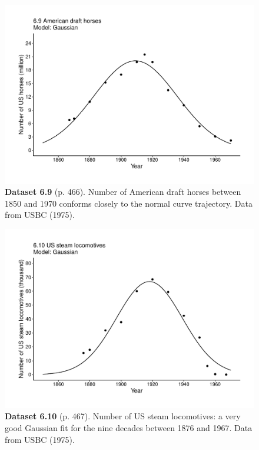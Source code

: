 \documentclass[aps,rmp,preprint,superscriptaddress,10pt,onecolumn]{article}
\begin{document}
\clearpage
\begin{figure}[h]
\includegraphics[width=\textwidth]{output/figs-ggplot/6.9.pdf}
\caption*{\textbf{Dataset 6.9} (p. 466). Number of American draft horses between 1850 and 1970 conforms closely to the normal curve trajectory. Data from USBC (1975). }
\end{figure}
	
\clearpage
\begin{figure}[h]
\includegraphics[width=\textwidth]{output/figs-ggplot/6.10.pdf}
\caption*{\textbf{Dataset 6.10} (p. 467). Number of US steam locomotives: a very good Gaussian fit for the nine decades between 1876 and 1967. Data from USBC (1975). }
\end{figure}
	
\end{document}

